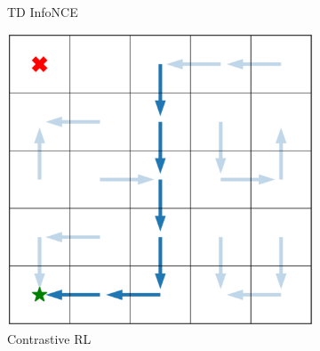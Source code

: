 \documentclass{article} %
\newcommand{\heavyxmark}{\ding{54}}%
\newcommand{\starmark}{\ding{72}}%
\begin{document}
\begin{figure}[t]
\begin{minipage}{0.48\textwidth}
\begin{subfigure}[c]{0.32\linewidth}
            \caption*{TD InfoNCE}
        \end{subfigure}
        \begin{subfigure}[c]{0.32\linewidth}
            \includegraphics[width=\linewidth]{figures/policy_analysis/stitching_contrastive.pdf}
            \caption*{Contrastive RL}
        \end{subfigure}
        \caption{\footnotesize \textbf{Stitching trajectories in a dataset.}  The behavioral policy collects ``Z" style trajectories. 
        Unlike the Monte Carlo method (contrastive RL) , our TD InfoNCE successfully ``stitches'' these trajectories together, navigating between pairs of (start \textcolor{Red}{\heavyxmark}, goal \textcolor{OliveGreen}{\starmark}) states unseen in the training trajectories. Appendix Fig.~\ref{fig:stitching-property-more} shows additional examples.
        }
        \label{fig:stitching-property}
    \end{minipage}
    \hfill
    \begin{minipage}{0.48\textwidth}
        \begin{subfigure}[c]{0.32\linewidth}

\end{subfigure}
\end{minipage}
\end{figure}
\end{document}
